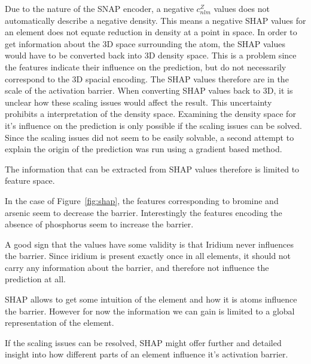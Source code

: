 Due to the nature of the SNAP encoder, a negative $c_{nlm}^Z$ values does not automatically 
describe a negative density.
This means a negative SHAP values for an element does not equate reduction in density
at a point in space.
In order to get information about the 3D space surrounding the atom, the SHAP values would have to be converted back into 3D density space.
This is a problem since the features indicate their influence on the prediction, but do not necessarily correspond 
to the 3D spacial encoding.
The SHAP values therefore are in the scale of the activation barrier.
When converting SHAP values back to 3D, it is unclear how these scaling issues would 
affect the result. 
This uncertainty prohibits a interpretation of the density space.
Examining the density space for it's influence on the prediction is only possible if the scaling
issues can be solved.
Since the scaling issues did not seem to be easily solvable, a second attempt to explain the origin of the prediction
was run using a gradient based method.

The information that can be extracted from SHAP values therefore is limited to feature space.

In the case of Figure~\ref{fig:shap}, the features corresponding to bromine and arsenic seem to decrease the barrier.
Interestingly the features encoding the absence of phosphorus seem to increase the barrier.

A good sign that the values have some validity is that Iridium never influences the barrier.
Since iridium is present exactly once in all elements, it should not carry any information about the barrier,
and therefore not influence the prediction at all.

SHAP allows to get some intuition of the element and how it is atoms influence the barrier.
However for now the information we can gain is limited to a global representation of the element.

If the scaling issues can be resolved, SHAP might offer further and detailed insight into how different parts of an element influence it's activation barrier.

